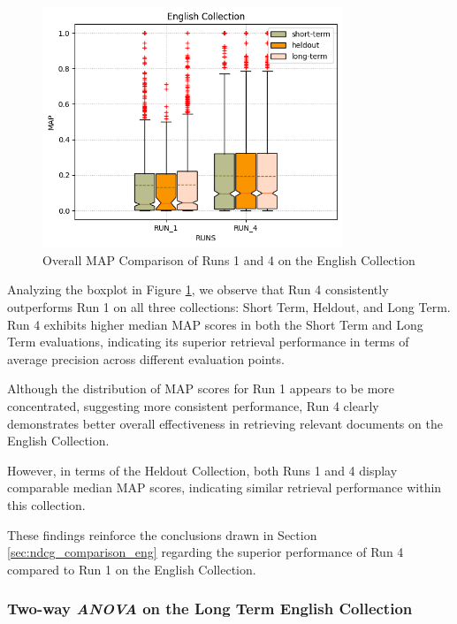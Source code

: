 \begin{figure}[!h]
\centering
\includegraphics[width=0.8\textwidth]{figure/StatisticalAnalysis/BoxPlot/MAP English.png}
\caption{Overall \ac{MAP} Comparison of Runs 1 and 4 on the English Collection}
\label{fig:map_english}
\end{figure}
 
Analyzing the boxplot in Figure \ref{fig:map_english}, we observe that Run 4 consistently outperforms Run 1 on all three collections: Short Term, Heldout, and Long Term. 
Run 4 exhibits higher median \ac{MAP} scores in both the Short Term and Long Term evaluations, indicating its superior retrieval performance in terms of average precision across different evaluation points.

Although the distribution of \ac{MAP} scores for Run 1 appears to be more concentrated, suggesting more consistent performance, Run 4 clearly demonstrates better overall effectiveness in retrieving relevant documents on the English Collection.

However, in terms of the Heldout Collection, both Runs 1 and 4 display comparable median \ac{MAP} scores, indicating similar retrieval performance within this collection. 

These findings reinforce the conclusions drawn in Section \ref{sec:ndcg_comparison_eng} regarding the superior performance of Run 4 compared to Run 1 on the English Collection. 


\newpage
\enlargethispage{8\baselineskip}
\subsubsection{Two-way \textit{ANOVA} on the Long Term English Collection}


